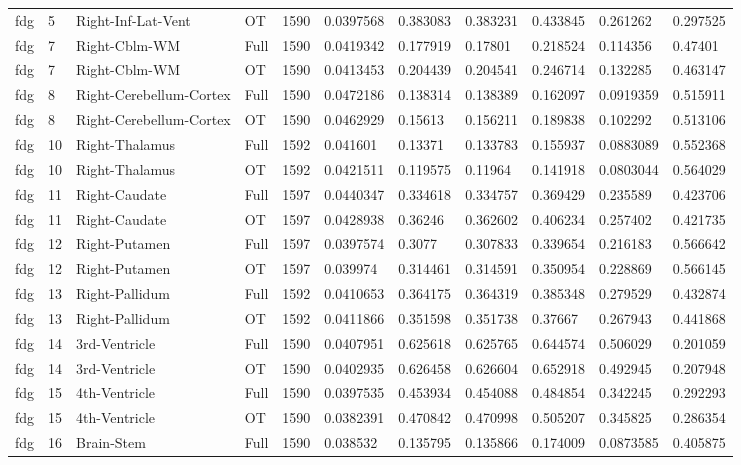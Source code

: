 \begin{landscape}
\begin{longtable}{lllllllllll}
fdg & 5 & Right-Inf-Lat-Vent & OT & 1590 & 0.0397568 & 0.383083 & 0.383231 & 0.433845 & 0.261262 & 0.297525 \\
fdg & 7 & Right-Cblm-WM & Full & 1590 & 0.0419342 & 0.177919 & 0.17801 & 0.218524 & 0.114356 & 0.47401 \\
fdg & 7 & Right-Cblm-WM & OT & 1590 & 0.0413453 & 0.204439 & 0.204541 & 0.246714 & 0.132285 & 0.463147 \\
fdg & 8 & Right-Cerebellum-Cortex & Full & 1590 & 0.0472186 & 0.138314 & 0.138389 & 0.162097 & 0.0919359 & 0.515911 \\
fdg & 8 & Right-Cerebellum-Cortex & OT & 1590 & 0.0462929 & 0.15613 & 0.156211 & 0.189838 & 0.102292 & 0.513106 \\
fdg & 10 & Right-Thalamus & Full & 1592 & 0.041601 & 0.13371 & 0.133783 & 0.155937 & 0.0883089 & 0.552368 \\
fdg & 10 & Right-Thalamus & OT & 1592 & 0.0421511 & 0.119575 & 0.11964 & 0.141918 & 0.0803044 & 0.564029 \\
fdg & 11 & Right-Caudate & Full & 1597 & 0.0440347 & 0.334618 & 0.334757 & 0.369429 & 0.235589 & 0.423706 \\
fdg & 11 & Right-Caudate & OT & 1597 & 0.0428938 & 0.36246 & 0.362602 & 0.406234 & 0.257402 & 0.421735 \\
fdg & 12 & Right-Putamen & Full & 1597 & 0.0397574 & 0.3077 & 0.307833 & 0.339654 & 0.216183 & 0.566642 \\
fdg & 12 & Right-Putamen & OT & 1597 & 0.039974 & 0.314461 & 0.314591 & 0.350954 & 0.228869 & 0.566145 \\
fdg & 13 & Right-Pallidum & Full & 1592 & 0.0410653 & 0.364175 & 0.364319 & 0.385348 & 0.279529 & 0.432874 \\
fdg & 13 & Right-Pallidum & OT & 1592 & 0.0411866 & 0.351598 & 0.351738 & 0.37667 & 0.267943 & 0.441868 \\
fdg & 14 & 3rd-Ventricle & Full & 1590 & 0.0407951 & 0.625618 & 0.625765 & 0.644574 & 0.506029 & 0.201059 \\
fdg & 14 & 3rd-Ventricle & OT & 1590 & 0.0402935 & 0.626458 & 0.626604 & 0.652918 & 0.492945 & 0.207948 \\
fdg & 15 & 4th-Ventricle & Full & 1590 & 0.0397535 & 0.453934 & 0.454088 & 0.484854 & 0.342245 & 0.292293 \\
fdg & 15 & 4th-Ventricle & OT & 1590 & 0.0382391 & 0.470842 & 0.470998 & 0.505207 & 0.345825 & 0.286354 \\
fdg & 16 & Brain-Stem & Full & 1590 & 0.038532 & 0.135795 & 0.135866 & 0.174009 & 0.0873585 & 0.405875 \\

\end{longtable}
\end{landscape}
